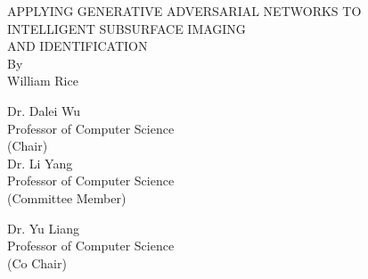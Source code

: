 \begin{titlepage}
    \begin{center}
    \doublespacing
    \vspace{\baselineskip}
    \vspace{\baselineskip}
    \vspace{\baselineskip}
    \vspace{\baselineskip}
    \vspace{\baselineskip}
    APPLYING GENERATIVE ADVERSARIAL NETWORKS TO \\
    INTELLIGENT SUBSURFACE IMAGING\\
    AND IDENTIFICATION\\
    \vspace{\baselineskip}
    \vspace{\baselineskip}
    \vspace{\baselineskip}
    \vspace{\baselineskip}
    \vspace{\baselineskip}
    By \\
    William Rice\\
    \vspace{\baselineskip}
    \vspace{\baselineskip}
    \vspace{\baselineskip}
    \vspace{\baselineskip}
    \vspace{\baselineskip}
    \singlespacing
    \begin{multicols*}{2}
    
    \raggedright
    Dr. Dalei Wu\\
    Professor of Computer Science\\
    (Chair)\\
    \vspace{\baselineskip}
    Dr. Li Yang \\
    Professor of Computer Science \\
    (Committee Member) \\
    \columnbreak
    
    Dr. Yu Liang\\
    Professor of Computer Science\\
    (Co Chair) \\
    \end{multicols*}
    
    \end{center}
\end{titlepage}
